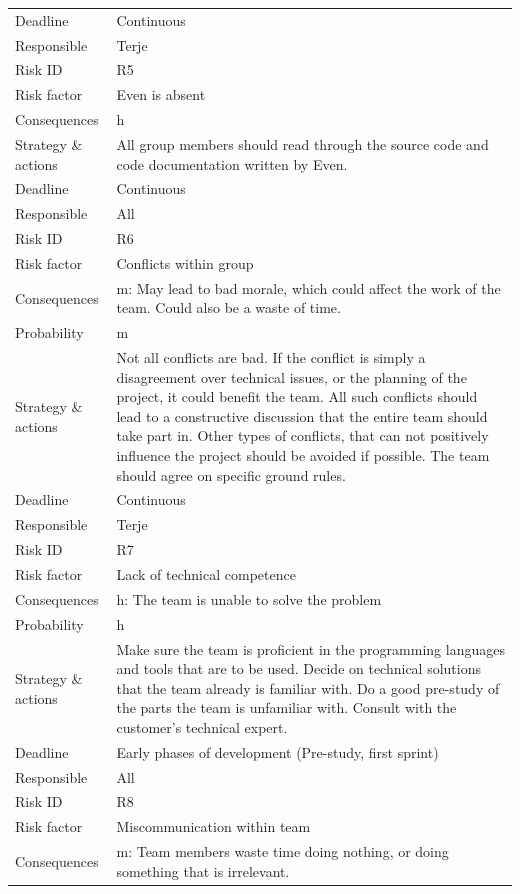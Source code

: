 \begin{longtable}{l p{9cm}}
	Deadline & Continuous \\
	Responsible & Terje \\
	\midrule
	Risk ID & R5 \\
	Risk factor & Even is absent \\
	Consequences & \Gls{h} \\
	Strategy \& actions & All group members should read through the source code and code documentation written by Even. \\
	Deadline & Continuous \\
	Responsible & All \\
	\midrule
	Risk ID & R6 \\
	Risk factor & Conflicts within group \\
	Consequences & \Gls{m}: May lead to bad morale, which could affect the work of the team. Could also be a waste of time. \\
	Probability & \Gls{m} \\ 
	Strategy \& actions & Not all conflicts are bad. If the conflict is simply a disagreement over technical issues, or the planning of the project, it could benefit the team. All such conflicts should lead to a constructive discussion that the entire team should take part in. Other types of conflicts, that can not positively influence the project should be avoided if possible. The team should agree on specific ground rules. \\
	Deadline & Continuous \\
	Responsible & Terje \\
	\midrule
	Risk ID & R7 \\
	Risk factor & Lack of technical competence \\
	Consequences & \Gls{h}: The team is unable to solve the problem  \\
	Probability & \Gls{h} \\ 
	Strategy \& actions & Make sure the team is proficient in the programming languages and tools that are to be used. Decide on technical solutions that the team already is familiar with. Do a good pre-study of the parts the team is unfamiliar with. Consult with the customer’s technical expert. \\
	Deadline & Early phases of development (Pre-study, first sprint) \\
	Responsible & All \\
	\midrule
	Risk ID & R8 \\
	Risk factor & Miscommunication within team \\
	Consequences & \Gls{m}: Team members waste time doing nothing, or doing something that is irrelevant. \\

\end{longtable}
